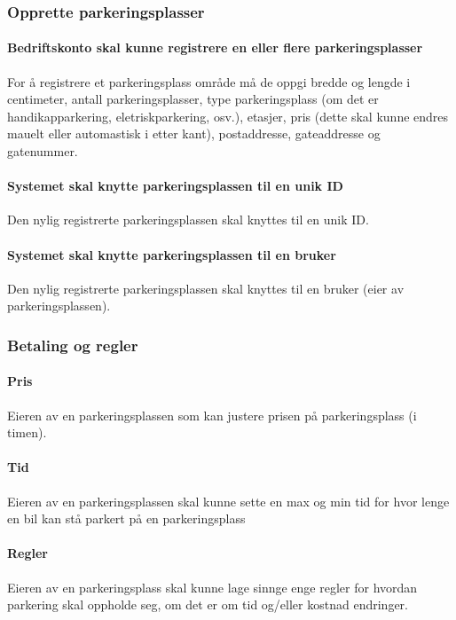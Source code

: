 \documentclass[12pt]{article}
\begin{document}
        \subsubsection{Opprette parkeringsplasser}

            \paragraph{Bedriftskonto skal kunne registrere en eller flere parkeringsplasser}
            For å registrere et parkeringsplass område må de oppgi bredde og lengde i centimeter, antall parkeringsplasser, type parkeringsplass (om det er handikapparkering, eletriskparkering, osv.), etasjer, pris (dette skal kunne endres mauelt eller automastisk i etter kant), postaddresse, gateaddresse og gatenummer.

            \paragraph{Systemet skal knytte parkeringsplassen til en unik ID}
            Den nylig registrerte parkeringsplassen skal knyttes til en unik ID.

            \paragraph{Systemet skal knytte parkeringsplassen til en bruker}
            Den nylig registrerte parkeringsplassen skal knyttes til en bruker (eier av parkeringsplassen).

        \subsubsection{Betaling og regler}

            \paragraph{Pris}
            Eieren av en parkeringsplassen som kan justere prisen på parkeringsplass (i timen).

            \paragraph{Tid}
            Eieren av en parkeringsplassen skal kunne sette en max og min tid for hvor lenge en bil kan stå parkert på en parkeringsplass

            \paragraph{Regler}
            Eieren av en parkeringsplass skal kunne lage sinnge enge regler for hvordan parkering skal oppholde seg, om det er om tid og/eller kostnad endringer.
        
\end{document}

